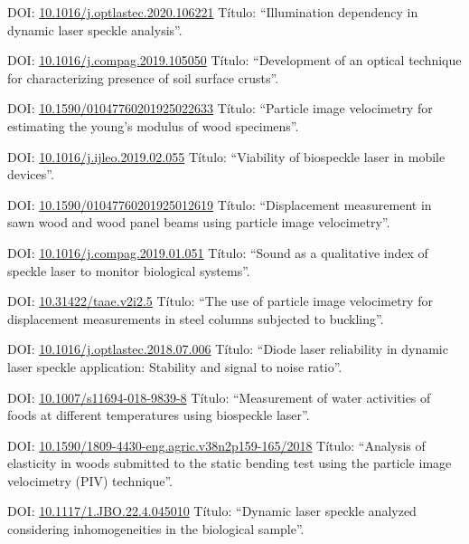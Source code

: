 \documentclass[11pt,a4paper,sans]{moderncv} %
\newcommand{\doiurl}[1]{\href{https://doi.org/#1}{#1}}
\begin{document}
	      {DOI: \doiurl{10.1016/j.optlastec.2020.106221}}{}{}
	      {Título: ``Illumination dependency in dynamic laser speckle analysis''.}


	      {DOI: \doiurl{10.1016/j.compag.2019.105050}}{}{}
	      {Título: ``Development of an optical technique for characterizing presence of soil surface crusts''.}


	      {DOI: \doiurl{10.1590/01047760201925022633}}{}{}
	      {Título: ``Particle image velocimetry for estimating the young’s modulus of wood specimens''.}

	      {DOI: \doiurl{10.1016/j.ijleo.2019.02.055}}{}{}
	      {Título: ``Viability of biospeckle laser in mobile devices''.}

	      {DOI: \doiurl{10.1590/01047760201925012619}}{}{}
	      {Título: ``Displacement measurement in sawn wood and wood panel beams using particle image velocimetry''.}

	      {DOI: \doiurl{10.1016/j.compag.2019.01.051}}{}{}
	      {Título: ``Sound as a qualitative index of speckle laser to monitor biological systems''.}

	      {DOI: \doiurl{10.31422/taae.v2i2.5}}{}{}
	      {Título: ``The use of particle image velocimetry for displacement measurements in steel columns subjected to buckling''.}
	      
	      {DOI: \doiurl{10.1016/j.optlastec.2018.07.006}}{}{}
	      {Título: ``Diode laser reliability in dynamic laser speckle application: Stability and signal to noise ratio''.}
	      
	      {DOI: \doiurl{10.1007/s11694-018-9839-8}}{}{}
	      {Título: ``Measurement of water activities of foods at different temperatures using biospeckle laser''.}

	      {DOI: \doiurl{10.1590/1809-4430-eng.agric.v38n2p159-165/2018}}{}{}
	      {Título: ``Analysis of elasticity in woods submitted to the static bending test using the particle image velocimetry (PIV) technique''.}

	      {DOI: \doiurl{10.1117/1.JBO.22.4.045010}}{}{}
	      {Título: ``Dynamic laser speckle analyzed considering inhomogeneities in the biological sample''.}
	      
\end{document}

